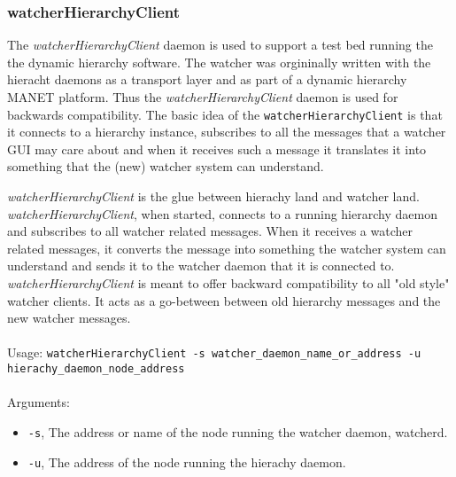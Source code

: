 \subsubsection{watcherHierarchyClient}

The {\it watcherHierarchyClient} daemon is used to support a test bed running the the dynamic hierarchy software. 
The watcher was orgininally written with the hieracht daemons as a transport layer and as part of a 
dynamic hierarchy MANET platform. Thus the {\it watcherHierarchyClient} daemon is used for backwards compatibility. 
The basic idea of the {\tt watcherHierarchyClient} is that it connects to a hierarchy instance, subscribes
to all the messages that a watcher GUI may care about and when it receives such a message it translates it 
into something that the (new) watcher system can understand. 

{\it watcherHierarchyClient} is the glue between hierachy land and watcher land. {\it watcherHierarchyClient}, when started, connects
to a running hierarchy daemon and subscribes to all watcher related messages. When it receives a watcher related
messages, it converts the message into something the watcher system can understand and sends it to the watcher daemon
that it is connected to. {\it watcherHierarchyClient} is meant to offer backward compatibility to all "old style" watcher 
clients. It acts as a go-between between old hierarchy messages and the new watcher messages.
\\\\
Usage:
{\tt watcherHierarchyClient -s watcher\_daemon\_name\_or\_address -u hierachy\_daemon\_node\_address}
\\\\
Arguments:
\begin{itemize}
\item {\tt -s}, The address or name of the node running the watcher daemon, watcherd.
\item {\tt -u}, The address of the node running the hierachy daemon.
\end{itemize}

